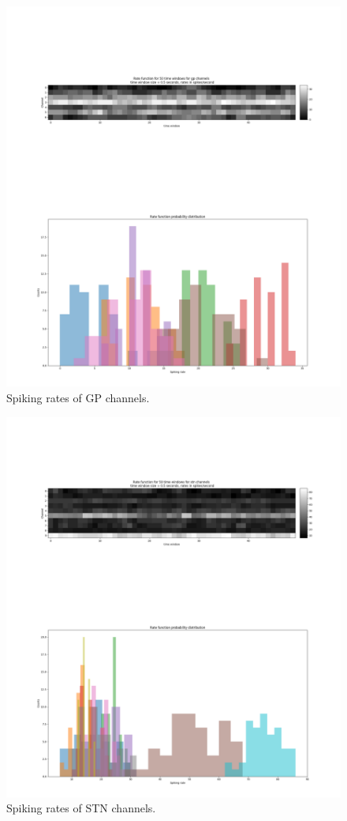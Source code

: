 \documentclass{article}
\begin{document}
\begin{figure}[H]
    \centering
    \centerline{\includegraphics[width=1\textwidth]{images/spiking/SR_gp.png}}
    \caption{Spiking rates of GP channels.}
    \label{fig:ratesGP1}
\end{figure}

\begin{figure}[H]
    \centering
    \centerline{\includegraphics[width=1\textwidth]{images/spiking/SR_stn.png}}
    \caption{Spiking rates of STN channels.}
    \label{fig:ratesSTN1}
\end{figure}
\end{document}
